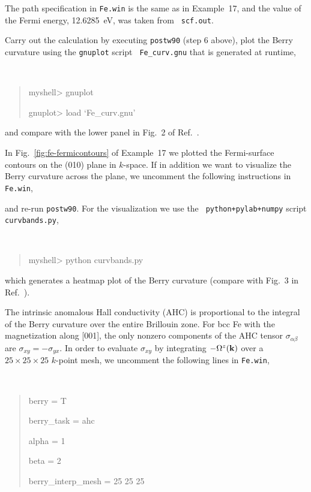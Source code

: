 \documentclass[a4paper,11pt,twoside]{article}
\begin{document}
The path specification in {\tt Fe.win} is the same as in Example~17,
and the value of the Fermi energy, 12.6285~eV, was taken from {\tt
  scf.out}. 

Carry out the calculation by executing {\tt postw90} (step 6 above),
plot the Berry curvature using the {\tt gnuplot} script {\tt
  Fe\_curv.gnu} that is generated at runtime,
{\tt
\begin{quote}
myshell> gnuplot

gnuplot> load `Fe\_curv.gnu'
\end{quote} }

and compare with the lower panel in Fig.~2 of Ref.~\cite{yao-prl04}.

In Fig.~\ref{fig:fe-fermicontours} of Example~17 we plotted the
Fermi-surface contours on the (010) plane in $k$-space.  If in
addition we want to visualize the Berry curvature across the plane, we
uncomment the following instructions in {\tt Fe.win}, 

and re-run {\tt postw90}.  For the visualization we use the {\tt
  python+pylab+numpy} script {\tt curvbands.py}, 
{\tt
\begin{quote}
myshell> python curvbands.py
\end{quote} }
\smallskip

which generates a heatmap plot of the Berry curvature (compare with
Fig.~3 in Ref.~\cite{yao-prl04}).

The intrinsic anomalous Hall conductivity (AHC) is proportional to the
integral of the Berry curvature over the entire Brillouin zone. For
bcc Fe with the magnetization along [001], the only nonzero components
of the AHC tensor $\sigma_{\alpha\beta}$ are
$\sigma_{xy}=-\sigma_{yx}$.  In order to evaluate $\sigma_{xy}$ by
integrating $-\Omega^z({\bf k})$ over a $25\times 25\times 25$
$k$-point mesh, we uncomment the following lines in {\tt Fe.win},
{\tt
\begin{quote}
berry = T

berry\_task = ahc                

alpha = 1                       

beta = 2

berry\_interp\_mesh = 25 25 25

\end{quote} } 
\end{document}
